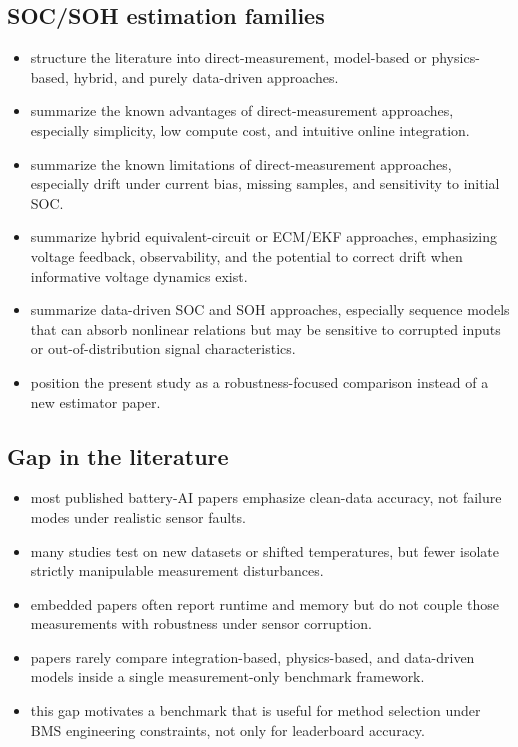 \documentclass[review]{elsarticle}
\begin{document}
\subsection{SOC/SOH estimation families}
\begin{itemize}[leftmargin=*]
    \item structure the literature into direct-measurement, model-based or physics-based, hybrid, and purely data-driven approaches.
    \item summarize the known advantages of direct-measurement approaches, especially simplicity, low compute cost, and intuitive online integration.
    \item summarize the known limitations of direct-measurement approaches, especially drift under current bias, missing samples, and sensitivity to initial SOC.
    \item summarize hybrid equivalent-circuit or ECM/EKF approaches, emphasizing voltage feedback, observability, and the potential to correct drift when informative voltage dynamics exist.
    \item summarize data-driven SOC and SOH approaches, especially sequence models that can absorb nonlinear relations but may be sensitive to corrupted inputs or out-of-distribution signal characteristics.
    \item position the present study as a robustness-focused comparison instead of a new estimator paper.
\end{itemize}

\subsection{Gap in the literature}
\begin{itemize}[leftmargin=*]
    \item most published battery-AI papers emphasize clean-data accuracy, not failure modes under realistic sensor faults.
    \item many studies test on new datasets or shifted temperatures, but fewer isolate strictly manipulable measurement disturbances.
    \item embedded papers often report runtime and memory but do not couple those measurements with robustness under sensor corruption.
    \item papers rarely compare integration-based, physics-based, and data-driven models inside a single measurement-only benchmark framework.
    \item this gap motivates a benchmark that is useful for method selection under BMS engineering constraints, not only for leaderboard accuracy.
\end{itemize}
\end{document}
